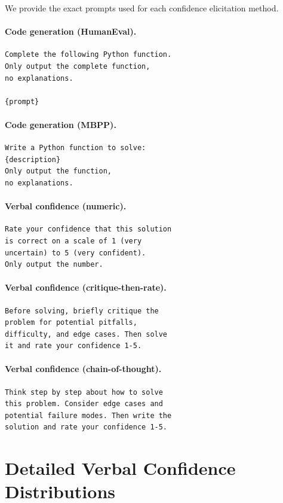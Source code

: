 \documentclass{article}
\begin{document}
We provide the exact prompts used for each confidence elicitation method.

\paragraph{Code generation (HumanEval).}
\begin{verbatim}
Complete the following Python function.
Only output the complete function,
no explanations.

{prompt}
\end{verbatim}

\paragraph{Code generation (MBPP).}
\begin{verbatim}
Write a Python function to solve:
{description}
Only output the function,
no explanations.
\end{verbatim}

\paragraph{Verbal confidence (numeric).}
\begin{verbatim}
Rate your confidence that this solution
is correct on a scale of 1 (very
uncertain) to 5 (very confident).
Only output the number.
\end{verbatim}

\paragraph{Verbal confidence (critique-then-rate).}
\begin{verbatim}
Before solving, briefly critique the
problem for potential pitfalls,
difficulty, and edge cases. Then solve
it and rate your confidence 1-5.
\end{verbatim}

\paragraph{Verbal confidence (chain-of-thought).}
\begin{verbatim}
Think step by step about how to solve
this problem. Consider edge cases and
potential failure modes. Then write the
solution and rate your confidence 1-5.
\end{verbatim}

\section{Detailed Verbal Confidence Distributions}
\label{app:distributions}
\end{document}
